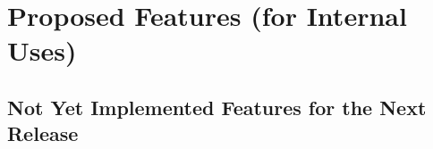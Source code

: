 %
%
%
%

\chapter{Proposed Features (for Internal Uses)}


\section{Not Yet Implemented Features for the Next Release}

